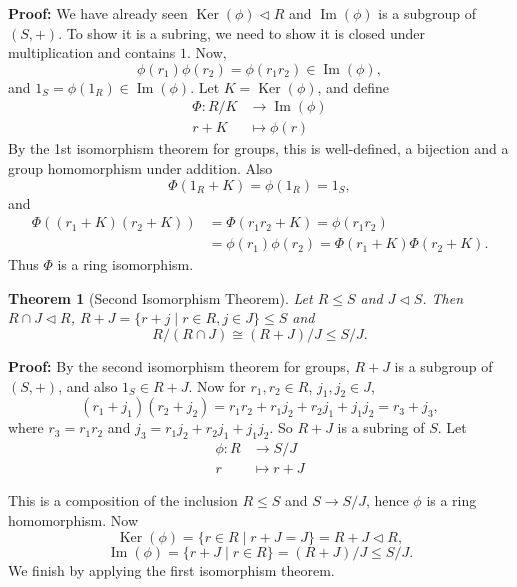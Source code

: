 \documentclass[12pt]{article}
\DeclareMathOperator{\Ker}{Ker}
\DeclareMathOperator{\Img}{Im}
\newtheorem{theorem}{Theorem}[section]
\theoremstyle{definition}
\theoremstyle{remark}
\begin{document}
\begin{adjustbox}{minipage = \columnwidth - 25.5pt, margin=1em, frame=1pt, margin=0em}
	\textbf{Proof:} We have already seen $\Ker(\phi) \lhd R$ and $\Img(\phi)$ is a subgroup of $(S, +)$. To show it is a subring, we need to show it is closed under multiplication and contains $1$. Now,
	\[
		\phi(r_1)\phi(r_2) = \phi(r_1r_2) \in \Img(\phi)
	,\]
	and $1_S = \phi(1_R) \in \Img(\phi)$. Let $K = \Ker(\phi)$, and define
	\begin{align*}
		\Phi : R/K &\to \Img(\phi) \\
		r + K &\mapsto \phi(r)
	\end{align*}
	By the 1st isomorphism theorem for groups, this is well-defined, a bijection and a group homomorphism under addition. Also
	\[
		\Phi(1_R + K) = \phi(1_R) = 1_S
	,\]
	and
	\begin{align*}
		\Phi((r_1 + K)(r_2 + K)) &= \Phi(r_1r_2 + K) = \phi(r_1r_2) \\
					 &= \phi(r_1)\phi(r_2) = \Phi(r_1 + K)\Phi(r_2 + K).
	\end{align*}
	Thus $\Phi$ is a ring isomorphism.
\end{adjustbox}

\begin{theorem}[Second Isomorphism Theorem]
	Let $R \leq S$ and $J \lhd S$. Then $R \cap J \lhd R$, $R + J = \{r + j \mid r \in R, j \in J\} \leq S$ and
	\[
		R/(R \cap J) \cong (R+J)/J \leq S/J
	.\]
\end{theorem}

\begin{adjustbox}{minipage = \columnwidth - 25.5pt, margin=1em, frame=1pt, margin=0em}
	\textbf{Proof:} By the second isomorphism theorem for groups, $R + J$ is a subgroup of $(S, +)$, and also $1_S \in R + J$. Now for $r_1, r_2 \in R$, $j_1, j_2 \in J$,
	\[
		(r_1 + j_1)(r_2 + j_2) = r_1r_2 + r_1j_2 + r_2j_1 + j_1j_2 = r_3 + j_3
	,\]
	where $r_3 = r_1r_2$ and $j_3 = r_1j_2 + r_2j_1 + j_1j_2$. So $R + J$ is a subring of $S$. Let
	\begin{align*}
		\phi : R &\to S/J \\
		r &\mapsto r + J
	\end{align*}
\end{adjustbox}

\begin{adjustbox}{minipage = \columnwidth - 25.5pt, margin=1em, frame=1pt, margin=0em}
	This is a composition of the inclusion $R \leq S$ and $S \to S/J$, hence $\phi$ is a ring homomorphism. Now
	\[
		\Ker(\phi) = \{r \in R \mid r + J = J\} = R + J \lhd R
	,\]
	\[
		\Img(\phi) = \{r + J \mid r \in R\} = (R+J)/J \leq S/J
	.\]
	We finish by applying the first isomorphism theorem.

\end{adjustbox}
\end{document}
